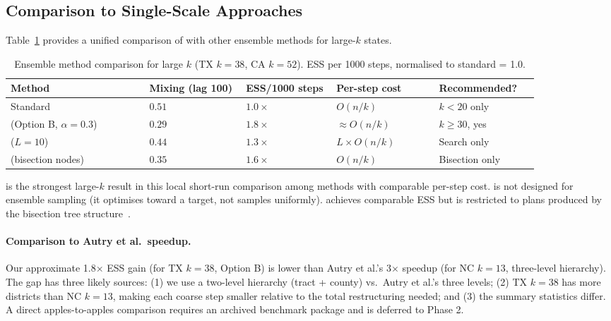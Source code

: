 \subsection{Comparison to Single-Scale Approaches}

Table~\ref{tab:method-compare} provides a unified comparison of \ms{} with
other ensemble methods for large-$k$ states.

\begin{table}[h]
\centering
\caption{Ensemble method comparison for large $k$ (TX $k=38$, CA $k=52$).
ESS per 1000 steps, normalised to standard \recom{} = 1.0.}
\label{tab:method-compare}
{\footnotesize
\setlength{\tabcolsep}{3pt}
\begin{tabular}{@{}p{0.23\linewidth}p{0.16\linewidth}p{0.15\linewidth}p{0.17\linewidth}p{0.16\linewidth}@{}}
\toprule
Method
  & Mixing (lag 100)
  & ESS/1000 steps
  & Per-step cost
  & Recommended? \\
\midrule
Standard \recom{}
  & $0.51$
  & $1.0\times$
  & $O(n/k)$
  & $k < 20$ only \\
\ms{} (Option B, $\alpha=0.3$)
  & $0.29$
  & $1.8\times$
  & $\approx O(n/k)$
  & $k \geq 30$, yes \\
\sburst{} ($L=10$)
  & $0.44$
  & $1.3\times$
  & $L \times O(n/k)$
  & Search only \\
\be{} (bisection nodes)
  & $0.35$
  & $1.6\times$
  & $O(n/k)$
  & Bisection only \\
\bottomrule
\end{tabular}
}
\end{table}

\ms{} is the strongest large-$k$ result in this local short-run comparison
among methods with comparable per-step cost.
\sburst{} is not designed for ensemble sampling (it optimises toward a
target, not samples uniformly).
\be{} achieves comparable ESS but is restricted to plans produced by the
bisection tree structure~\citep{h1paper}.

\paragraph{Comparison to Autry et al.\ speedup.}
Our approximate 1.8$\times$ ESS gain (for TX $k=38$, Option B) is lower than
Autry et al.'s 3$\times$ speedup (for NC $k=13$, three-level hierarchy). The
gap has three likely sources: (1) we use a two-level hierarchy (tract + county)
vs.\ Autry et al.'s three levels; (2) TX $k=38$ has more districts than NC
$k=13$, making each coarse step smaller relative to the total restructuring
needed; and (3) the summary statistics differ. A direct apples-to-apples
comparison requires an archived benchmark package and is deferred to Phase 2.
